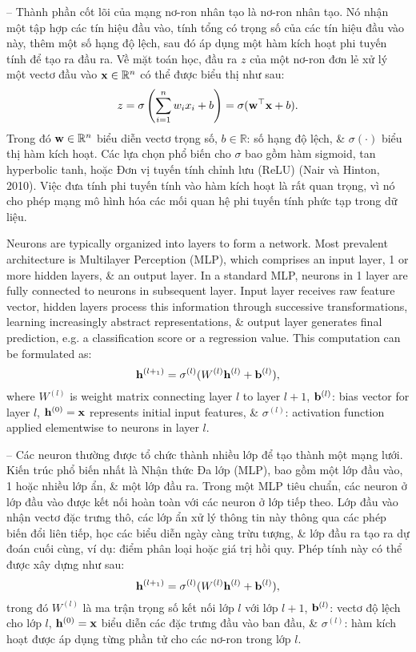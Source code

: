 \documentclass{article}
\begin{document}
\begin{itemize}
\begin{itemize}
        -- Thành phần cốt lõi của mạng nơ-ron nhân tạo là nơ-ron nhân tạo. Nó nhận một tập hợp các tín hiệu đầu vào, tính tổng có trọng số của các tín hiệu đầu vào này, thêm một số hạng độ lệch, sau đó áp dụng một hàm kích hoạt phi tuyến tính để tạo ra đầu ra. Về mặt toán học, đầu ra $z$ của một nơ-ron đơn lẻ xử lý một vectơ đầu vào ${\bf x}\in\mathbb{R}^n$ có thể được biểu thị như sau:
        \begin{equation*}
            z = \sigma\left(\sum_{i=1}^n w_ix_i + b\right) = \sigma({\bf w}^\top{\bf x} + b).
        \end{equation*}
        Trong đó ${\bf w}\in\mathbb{R}^n$ biểu diễn vectơ trọng số, $b\in\mathbb{R}$: số hạng độ lệch, \& $\sigma(\cdot)$ biểu thị hàm kích hoạt. Các lựa chọn phổ biến cho $\sigma$ bao gồm hàm sigmoid, tan hyperbolic tanh, hoặc Đơn vị tuyến tính chỉnh lưu (ReLU) (Nair và Hinton, 2010). Việc đưa tính phi tuyến tính vào hàm kích hoạt là rất quan trọng, vì nó cho phép mạng mô hình hóa các mối quan hệ phi tuyến tính phức tạp trong dữ liệu.

        Neurons are typically organized into layers to form a network. Most prevalent architecture is Multilayer Perception (MLP), which comprises an input layer, 1 or more hidden layers, \& an output layer. In a standard MLP, neurons in 1 layer are fully connected to neurons in subsequent layer. Input layer receives raw feature vector, hidden layers process this information through successive transformations, learning increasingly abstract representations, \& output layer generates final prediction, e.g. a classification score or a regression value. This computation can be formulated as:
        \begin{equation*}
            {\bf h}^{(l +_1)} = \sigma^{(l)}(W^{(l)}{\bf h}^{(l)} + {\bf b}^{(l)}),
        \end{equation*}
        where $W^{(l)}$ is weight matrix connecting layer $l$ to layer $l + 1$, ${\bf b}^{(l)}$: bias vector for layer $l$, ${\bf h}^{(0)} = {\bf x}$ represents initial input features, \& $\sigma^{(l)}$: activation function applied elementwise to neurons in layer $l$.

        -- Các neuron thường được tổ chức thành nhiều lớp để tạo thành một mạng lưới. Kiến trúc phổ biến nhất là Nhận thức Đa lớp (MLP), bao gồm một lớp đầu vào, 1 hoặc nhiều lớp ẩn, \& một lớp đầu ra. Trong một MLP tiêu chuẩn, các neuron ở lớp đầu vào được kết nối hoàn toàn với các neuron ở lớp tiếp theo. Lớp đầu vào nhận vectơ đặc trưng thô, các lớp ẩn xử lý thông tin này thông qua các phép biến đổi liên tiếp, học các biểu diễn ngày càng trừu tượng, \& lớp đầu ra tạo ra dự đoán cuối cùng, ví dụ: điểm phân loại hoặc giá trị hồi quy. Phép tính này có thể được xây dựng như sau:
        \begin{equation*}
            {\bf h}^{(l +_1)} = \sigma^{(l)}(W^{(l)}{\bf h}^{(l)} + {\bf b}^{(l)}),
        \end{equation*}
        trong đó $W^{(l)}$ là ma trận trọng số kết nối lớp $l$ với lớp $l + 1$, ${\bf b}^{(l)}$: vectơ độ lệch cho lớp $l$, ${\bf h}^{(0)} = {\bf x}$ biểu diễn các đặc trưng đầu vào ban đầu, \& $\sigma^{(l)}$: hàm kích hoạt được áp dụng từng phần tử cho các nơ-ron trong lớp $l$.


\end{itemize}
\end{itemize}
\end{document}
